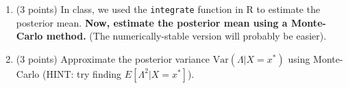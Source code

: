 \documentclass[10pt,twoside]{article}\usepackage[]{graphicx}\usepackage[dvipsnames,svgnames,table]{xcolor}
\begin{document}
\begin{enumerate}
    \begin{enumerate}
      \item (3 points) In class, we used the \texttt{integrate} function in R to estimate the posterior mean. \textbf{Now, estimate the posterior mean using a Monte-Carlo method.} (The numerically-stable version will probably be easier).
      \item (3 points) Approximate the posterior variance $\text{Var}(\Lambda | X = x^*)$ using Monte-Carlo (HINT: try finding $E[\Lambda^2 | X = x^*]$).

    \end{enumerate}


\end{enumerate}
\end{document}
